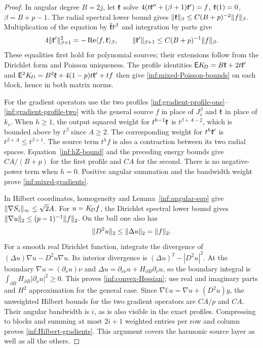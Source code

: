 \begin{proof}
In angular degree $B=2j$, let $\mathfrak{k}$ solve
$4(t\mathfrak{k}''+(\beta+1)\mathfrak{k}')=f$, $\mathfrak{k}(1)=0$, $\beta=B+p-1$.
The radial spectral lower bound gives
$\lVert \mathfrak{k}\rVert_\beta\le C(B+p)^{-2}\lVert f\rVert_\beta$.
Multiplication of the equation by $\overline{\mathfrak{k}} t^\beta$ and integration
by parts give
\[
 4\lVert \mathfrak{k}'\rVert_{\beta+1}^2
 =-\operatorname{Re}\langle f,\mathfrak{k}\rangle_\beta,
 \qquad
 \lVert \mathfrak{k}'\rVert_{\beta+1}\le C(B+p)^{-1}\lVert f\rVert_\beta.
\]
These equalities first hold for polynomial sources; their
extensions follow from the Dirichlet form and Poisson uniqueness.
The profile identities
$\mathsf EK_{\!D}=B\mathfrak{k}+2t\mathfrak{k}'$ and
$\mathsf E^2K_{\!D}=B^2\mathfrak{k}+4(1-p)t\mathfrak{k}'+tf$
then give \eqref{inf:mixed-Poisson-bounds} on each block, hence in
both matrix norms.

For the gradient operators use the two profiles
\eqref{inf:gradient-profile-one}--\eqref{inf:gradient-profile-two}
with the general source $f$ in place of $J_s^\beta$ and
$\mathfrak{k}$ in place of $k_s$.
When $h\ge1$, the output squared weight for $t^{h-1}\mathfrak{k}$ is
$t^{\beta+A-2}$, which is bounded above by $t^\beta$ since
$A\ge2$. The corresponding weight for $t^h\mathfrak{k}'$ is
$t^{\beta+A}\le t^{\beta+1}$.
The source term $t^hf$ is also a contraction between its two
radial spaces. Equation~\eqref{inf:hZ-bound} and the preceding
energy bounds give $CA/(B+p)$ for the first profile and $CA$ for
the second. There is no negative-power term when $h=0$.
Positive angular summation and the bandwidth weight prove
\eqref{inf:mixed-gradients}.

In Hilbert coordinates, homogeneity and
Lemma~\ref{inf:angular-sup} give
$\lVert \nabla S_i\rVert_\infty\le\sqrt2A$.
For $u=K_{\!D} f$, the Dirichlet spectral lower bound gives
$\lVert \nabla u\rVert_2\le(p-1)^{-1}\lVert f\rVert_2$.
On the ball one also has
\begin{equation}\label{inf:convex-Hessian}
 \lVert D^2u\rVert_2\le\lVert \Delta u\rVert_2=\lVert f\rVert_2.
\end{equation}
For a smooth real Dirichlet function, integrate the divergence of
$(\Delta u)\nabla u-D^2u\nabla u$.
Its interior divergence is $(\Delta u)^2-|D^2u|^2$.
At the boundary $\nabla u=(\partial_\nu u)\nu$ and
$\Delta u=\partial_{\nu\nu}u+H_{\partial B}\partial_\nu u$,
so the boundary integral is
$\int_{\partial B}H_{\partial B}|\partial_\nu u|^2\ge0$.
This proves \eqref{inf:convex-Hessian}; use real and imaginary
parts and $H^2$ approximation for the general case.
Since $\nabla\Euler u=\nabla u+(D^2u)y$, the unweighted Hilbert
bounds for the two gradient operators are $CA/p$ and $CA$.
Their angular bandwidth is $i$, as is also visible in the exact
profiles. Compressing to blocks and summing at most $2i+1$
weighted entries per row and column proves
\eqref{inf:Hilbert-gradients}. This argument covers the harmonic
source layer as well as all the others.
\end{proof}

